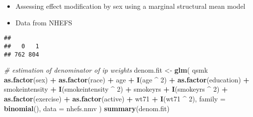 \documentclass[10pt,]{book}
\newenvironment{Shaded}{\begin{snugshade}}{\end{snugshade}}
\newcommand{\CommentTok}[1]{\textcolor[rgb]{0.56,0.35,0.01}{\textit{#1}}}
\newcommand{\DataTypeTok}[1]{\textcolor[rgb]{0.13,0.29,0.53}{#1}}
\newcommand{\DecValTok}[1]{\textcolor[rgb]{0.00,0.00,0.81}{#1}}
\newcommand{\KeywordTok}[1]{\textcolor[rgb]{0.13,0.29,0.53}{\textbf{#1}}}
\newcommand{\NormalTok}[1]{#1}
\newcommand{\OperatorTok}[1]{\textcolor[rgb]{0.81,0.36,0.00}{\textbf{#1}}}
\newcommand{\StringTok}[1]{\textcolor[rgb]{0.31,0.60,0.02}{#1}}
\providecommand{\tightlist}{%
  \setlength{\itemsep}{0pt}\setlength{\parskip}{0pt}}
\begin{document}
\begin{itemize}
\tightlist
\item
  Assessing effect modification by sex using a marginal structural mean model
\item
  Data from NHEFS
\end{itemize}

\begin{Shaded}
\end{Shaded}

\begin{verbatim}
## 
##   0   1 
## 762 804
\end{verbatim}

\begin{Shaded}
\begin{Highlighting}[]
\CommentTok{# estimation of denominator of ip weights}
\NormalTok{denom.fit <-}
\StringTok{  }\KeywordTok{glm}\NormalTok{(}
\NormalTok{    qsmk }\OperatorTok{~}\StringTok{ }\KeywordTok{as.factor}\NormalTok{(sex) }\OperatorTok{+}\StringTok{ }\KeywordTok{as.factor}\NormalTok{(race) }\OperatorTok{+}\StringTok{ }\NormalTok{age }\OperatorTok{+}\StringTok{ }\KeywordTok{I}\NormalTok{(age }\OperatorTok{^}\StringTok{ }\DecValTok{2}\NormalTok{) }\OperatorTok{+}
\StringTok{      }\KeywordTok{as.factor}\NormalTok{(education) }\OperatorTok{+}\StringTok{ }\NormalTok{smokeintensity }\OperatorTok{+}
\StringTok{      }\KeywordTok{I}\NormalTok{(smokeintensity }\OperatorTok{^}\StringTok{ }\DecValTok{2}\NormalTok{) }\OperatorTok{+}\StringTok{ }\NormalTok{smokeyrs }\OperatorTok{+}\StringTok{ }\KeywordTok{I}\NormalTok{(smokeyrs }\OperatorTok{^}\StringTok{ }\DecValTok{2}\NormalTok{) }\OperatorTok{+}
\StringTok{      }\KeywordTok{as.factor}\NormalTok{(exercise) }\OperatorTok{+}\StringTok{ }\KeywordTok{as.factor}\NormalTok{(active) }\OperatorTok{+}\StringTok{ }\NormalTok{wt71 }\OperatorTok{+}\StringTok{ }\KeywordTok{I}\NormalTok{(wt71 }\OperatorTok{^}\StringTok{ }\DecValTok{2}\NormalTok{),}
    \DataTypeTok{family =} \KeywordTok{binomial}\NormalTok{(),}
    \DataTypeTok{data =}\NormalTok{ nhefs.nmv}
\NormalTok{  )}
\KeywordTok{summary}\NormalTok{(denom.fit)}
\end{Highlighting}
\end{Shaded}
\end{document}
